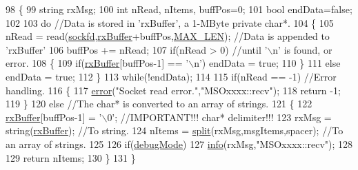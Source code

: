 \begin{DoxyCode}
98 \{
99     \textcolor{keywordtype}{string} rxMsg;
100     \textcolor{keywordtype}{int} nRead, nItems, buffPos=0;
101     \textcolor{keywordtype}{bool} endData=\textcolor{keyword}{false};
102 
103     \textcolor{keywordflow}{do}          \textcolor{comment}{//Data is stored in 'rxBuffer', a 1-MByte private char*.}
104     \{
105         nRead = read(\hyperlink{classMSOxxxx_acf030a8f1ddd78d632816c856f50455c}{sockfd},\hyperlink{classMSOxxxx_a1a50770759caada18087ca8ffb96f357}{rxBuffer}+buffPos,\hyperlink{MSOxxxx_8h_aabf4f709c8199e41cf279c77112345fe}{MAX\_LEN}); \textcolor{comment}{//Data is appended to
       'rxBuffer'}
106         buffPos += nRead;
107         \textcolor{keywordflow}{if}(nRead > 0)                                                                       \textcolor{comment}{//until '\(\backslash\)n' is
       found, or error.}
108         \{
109             \textcolor{keywordflow}{if}(\hyperlink{classMSOxxxx_a1a50770759caada18087ca8ffb96f357}{rxBuffer}[buffPos-1] == \textcolor{charliteral}{'\(\backslash\)n'}) endData = \textcolor{keyword}{true};
110         \}
111         \textcolor{keywordflow}{else} endData = \textcolor{keyword}{true};
112     \}
113     \textcolor{keywordflow}{while}(!endData); 
114 
115     \textcolor{keywordflow}{if}(nRead == -1)                                                                     \textcolor{comment}{//Error handling.}
116     \{
117         \hyperlink{classObject_a204a95f57818c0f811933917a30eff45}{error}(\textcolor{stringliteral}{"Socket read error."},\textcolor{stringliteral}{"MSOxxxx::recv"});
118         \textcolor{keywordflow}{return} -1;
119     \}
120     \textcolor{keywordflow}{else}                                                                                    \textcolor{comment}{//The char* is
       converted to an array of strings.}
121     \{
122         \hyperlink{classMSOxxxx_a1a50770759caada18087ca8ffb96f357}{rxBuffer}[buffPos-1] = \textcolor{charliteral}{'\(\backslash\)0'};                                 \textcolor{comment}{//IMPORTANT!!! char*
       delimiter!!!}
123         rxMsg = string(\hyperlink{classMSOxxxx_a1a50770759caada18087ca8ffb96f357}{rxBuffer});                                       \textcolor{comment}{//To string.}
124         nItems = \hyperlink{classMSOxxxx_a46726c6d181a758bb4f598c66f336236}{split}(rxMsg,msgItems,spacer);         \textcolor{comment}{//To an array of strings.}
125 
126         \textcolor{keywordflow}{if}(\hyperlink{classMSOxxxx_a826ba82e93bbe5780169107a31dbfd29}{debugMode})
127             \hyperlink{classObject_a644fd329ea4cb85f54fa6846484b84a8}{info}(rxMsg,\textcolor{stringliteral}{"MSOxxxx::recv"});
128 
129         \textcolor{keywordflow}{return} nItems;
130     \}
131 \}
\end{DoxyCode}
\mbox{\label{classMSOxxxx_a26f03d21da556529155898dc115c301c}} 
